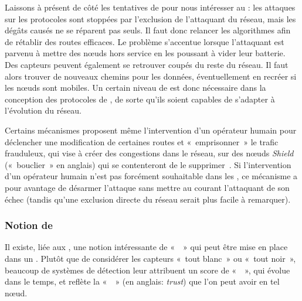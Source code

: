 Laissons à présent de côté les tentatives de  pour nous intéresser au : les attaques sur les protocoles sont stoppées par l'exclusion de l'attaquant du réseau, mais les dégâts causés ne se réparent pas seuls.
Il faut donc relancer les algorithmes afin de rétablir des routes efficaces.
Le problème s'accentue lorsque l'attaquant est parvenu à mettre des nœuds hors service en les poussant à vider leur batterie.
Des capteurs peuvent également se retrouver coupés du reste du réseau.
Il faut alors trouver de nouveaux chemins pour les données, éventuellement en recréer si les nœuds sont mobiles.
Un certain niveau de \resilience est donc nécessaire dans la conception des protocoles de , de sorte qu'ils soient capables de s'adapter à l'évolution du réseau.

Certains mécanismes proposent même l'intervention d'un opérateur humain pour déclencher une modification de certaines routes et « emprisonner » le trafic frauduleux, qui vise à créer des congestions dans le réseau, sur des nœuds \textit{Shield} (« bouclier » en anglais) qui se contenteront de le supprimer~\cite{HSP13}.
Si l'intervention d'un opérateur humain n'est pas forcément souhaitable dans les \rcs, ce mécanisme a pour avantage de désarmer l'attaque sans mettre au courant l'attaquant de son échec (tandis qu'une exclusion directe du réseau serait plus facile à remarquer).

\subsubsection{Notion de }
Il existe, liée aux \IDS, une notion intéressante de «  » qui peut être mise en place dans un \rc.
Plutôt que de considérer les capteurs « tout blanc » ou « tout noir », beaucoup de systèmes de détection leur attribuent un score de « \reput », qui évolue dans le temps, et reflète la «  » (en anglais: \textit{trust}) que l'on peut avoir en tel nœud.

